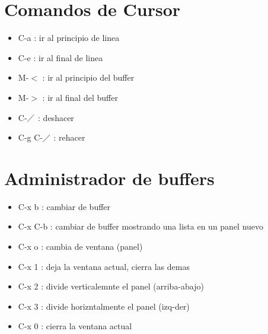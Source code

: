 \documentclass[a4paper, twocolumn]{article}
\begin{document}
\begin{landscape}
\begin{multicols}{2}
\section*{Comandos de Cursor}
\begin{multicols}{2}
\begin{itemize}
	\item C-a : ir al principio de linea
	\item C-e : ir al final de linea
	\item M-$<$ : ir al principio del buffer
	\item M-$>$ : ir al final del buffer
	
	\item C-$\diagup$ : deshacer
	\item C-g C-$\diagup$ : rehacer
\end{itemize}
\end{multicols}

\section*{Administrador de buffers}
\begin{multicols}{2}
\begin{itemize}
	\item C-x b : cambiar de buffer
	\item C-x C-b : cambiar de buffer mostrando una lista en un panel nuevo
	\item C-x o : cambia de ventana (panel)
	
	\item C-x 1 : deja la ventana actual, cierra las demas
	\item C-x 2 : divide verticalemnte el panel (arriba-abajo)
	\item C-x 3 : divide horizntalmente el panel (izq-der)
	\item C-x 0 : cierra la ventana actual
\end{itemize}
\end{multicols}



\end{multicols}
\end{landscape}
\end{document}
